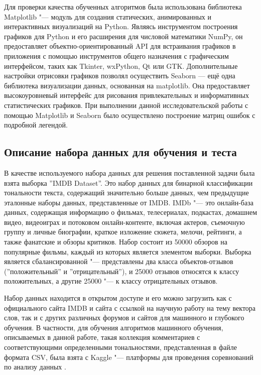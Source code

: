 \documentclass[bachelor, och, coursework]{SCWorks}
\begin{document}
        Для проверки качества обученных алгоритмов была использована библиотека
        Matplotlib "--- модуль для создания статических, анимированных и
        интерактивных визуализаций на Python. Являясь инструментом построения
        графиков для Python и его расширения для числовой математики NumPy, он
        предоставляет объектно-ориентированный API для встраивания графиков в
        приложения с помощью инструментов общего назначения с графическим
        интерфейсом, таких как Tkinter, wxPython, Qt или GTK. Дополнительные
        настройки отрисовки графиков позволял осуществить Seaborn — ещё одна
        библиотека визуализации данных, основанная на matplotlib. Она
        предоставляет высокоуровневый интерфейс для рисования привлекательных и
        информативных статистических графиков. При выполнении данной
        исследовательской работы с помощью Matplotlib и Seaborn было
        осуществлено построение матриц ошибок с подробной легендой.

    \subsection{Описание набора данных для обучения и теста}

        В качестве используемого набора данных для решения поставленной задачи
        была взята выборка ''IMDB Dataset''. Это набор данных для бинарной
        классификации тональности текста, содержащий значительно больше данных,
        чем предыдущие эталонные наборы данных, представленные от IMDB. IMDb
        "--- это онлайн-база данных, содержащая информацию о фильмах,
        телесериалах, подкастах, домашнем видео, видеоиграх и потоковом
        онлайн-контенте, включая актеров, съемочную группу и личные биографии,
        краткое изложение сюжета, мелочи, рейтинги, а также фанатские и обзоры
        критиков. Набор состоит из 50000 обзоров на популярные фильмы, каждый из
        которых является элементом выборки. Выборка является сбалансированной
        "--- представлены два класса объектов-отзывов (''положительный'' и
        ''отрицательный''), и 25000 отзывов относятся к классу положительных, а
        другие 25000 "--- к классу отрицательных отзывов. 

        Набор данных находится в открытом доступе и его можно загрузить как с
        официального сайта IMDB и сайта с ссылкой на научную работу на тему
        вектора слов, так и с других различных форумов и сайтов для машинного и
        глубокого обучения. В частности, для обучения алгоритмов машинного
        обучения, описываемых в данной работе, такая коллекция комментариев с
        соответствующими определенными тональностями, представленная в файле
        формата CSV, была взята с Kaggle "--- платформы для проведения
        соревнований по анализу данных \cite{dataset}.
\end{document}
